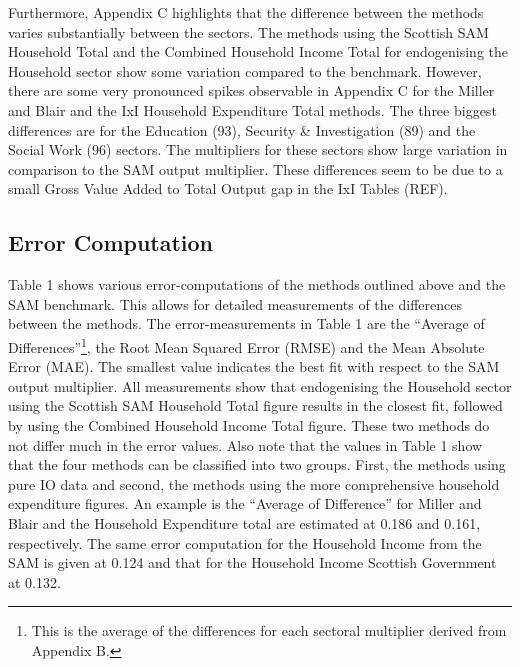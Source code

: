\begin{doublespacing}
\bigskip

Furthermore, Appendix C highlights that the difference between the methods varies substantially between the sectors. The methods using the Scottish SAM Household Total and the Combined Household Income Total for endogenising the Household sector show some variation compared to the benchmark. However, there are some very pronounced spikes observable in Appendix C for the Miller and Blair and the IxI Household Expenditure Total methods. The three biggest differences are for the Education (93), Security \& Investigation (89) and the Social Work (96) sectors. The multipliers for these sectors show large variation in comparison to the SAM output multiplier. These differences seem to be due to a small Gross Value Added to Total Output gap in the IxI Tables (REF).


\subsection{Error Computation}
\label{sec:4.5.3}

Table 1 shows various error-computations of the methods outlined above and the SAM benchmark. This allows for detailed measurements of the differences between the methods. The error-measurements in Table 1 are the ``Average of Differences''\footnote{This is the average of the differences for each sectoral multiplier derived from Appendix B.}, the Root Mean Squared Error (RMSE) and the Mean Absolute Error (MAE). The smallest value indicates the best fit with respect to the SAM output multiplier. All measurements show that endogenising the Household sector using the Scottish SAM Household Total figure results in the closest fit, followed by using the Combined Household Income Total figure. These two methods do not differ much in the error values. Also note that the values in Table 1 show that the four methods can be classified into two groups. First, the methods using pure IO data and second, the methods using the more comprehensive household expenditure figures. An example is the ``Average of Difference'' for Miller and Blair and the Household Expenditure total are estimated at 0.186 and 0.161, respectively. The same error computation for the Household Income from the SAM is given at 0.124 and that for the Household Income Scottish Government at 0.132.



\end{doublespacing}
